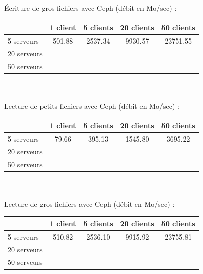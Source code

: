 \documentclass[12pt]{report}
\begin{document}
			Écriture de gros fichiers avec Ceph (débit en Mo/sec) :

			\begin{tabular}{|l|c|c|c|c|}
				\hline
				& 1 client & 5 clients & 20 clients & 50 clients \\
				\hline
				5 serveurs & 501.88 & 2537.34 & 9930.57 & 23751.55 \\
				\hline
				20 serveurs & & & & \\
				\hline
				50 serveurs & & & & \\
				\hline
			\end{tabular}\\\\

			Lecture de petits fichiers avec Ceph (débit en Mo/sec) :

			\begin{tabular}{|l|c|c|c|c|}
				\hline
				& 1 client & 5 clients & 20 clients & 50 clients \\
				\hline
				5 serveurs & 79.66 & 395.13 & 1545.80 & 3695.22 \\
				\hline
				20 serveurs & & & & \\
				\hline
				50 serveurs & & & & \\
				\hline
			\end{tabular}\\\\

			Lecture de gros fichiers avec Ceph (débit en Mo/sec) :

			\begin{tabular}{|l|c|c|c|c|}
				\hline
				& 1 client & 5 clients & 20 clients & 50 clients \\
				\hline
				5 serveurs & 510.82 & 2536.10 & 9915.92 & 23755.81 \\
				\hline
				20 serveurs & & & & \\
				\hline
				50 serveurs & & & & \\
				\hline
			\end{tabular}
\end{document}
